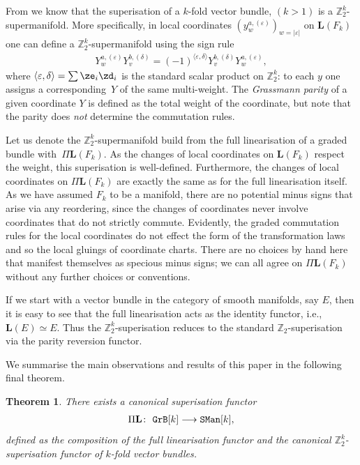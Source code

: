 \documentclass[10pt,a4paper]{amsart}
\newcommand{\ep}{\varepsilon}
\newcommand{\catname}[1]{\textnormal{\texttt{#1}}}
\def\Linr{{\mathbf{L}}} %
\numberwithin{equation}{section}
\newtheorem{Theorem}{Theorem}[section]
\begin{document}
From \cite[Proposition~5.5]{Covolo:2014a} we know that the superisation of a $k$-fold vector bundle, $(k >1)$ is a $ \mathbb{Z}_{2}^k$-supermanifold.
More specif\/ically, in local coordinates $(y^{a, (\ep)}_w)_{w=|\ep|}$ on $\Linr(F_{k})$ one can def\/ine a $\mathbb{Z}_{2}^{k}$-supermanifold using the sign rule
\begin{gather*}
Y^{a, (\ep)}_w Y^{b, (\delta)}_v = (-1)^{\langle \ep , \delta \rangle}Y^{b, (\delta)}_v Y^{a, (\ep)}_w,
\end{gather*}
where $\langle \ep , \delta \rangle=\sum\ze_i\zd_i$ is the standard scalar product on $\mathbb{Z}_{2}^{k}$: to each $y$ one assigns a correspon\-ding~$Y$ of the same multi-weight. The \emph{Grassmann parity} of a given coordinate $Y$ is def\/ined as the total weight of the coordinate, but note that the parity does \emph{not} determine the commutation rules.

Let us denote the $\mathbb{Z}_{2}^{k}$-supermanifold build from the full linearisation of a graded bundle with~$\Pi \Linr(F_{k})$. As the changes of local coordinates on $\Linr(F_{k})$ respect the weight, this superisation is well-def\/ined. Furthermore, the changes of local coordinates on $\Pi \Linr(F_{k})$ are exactly the same as for the full linearisation itself. As we have assumed $F_{k}$ to be a manifold, there are no potential minus signs that arise via any reordering, since the changes of coordinates never involve coordinates that do not strictly commute. Evidently, the graded commutation rules for the local coordinates do not ef\/fect the form of the transformation laws and so the local gluings of coordinate charts. There are no choices by hand here that manifest themselves as specious minus signs; we can all agree on $\Pi \Linr(F_{k})$ without any further choices or conventions.

If we start with a vector bundle in the category of smooth manifolds, say $E$, then it is easy to see that the full linearisation acts as the identity functor, i.e., $\Linr(E) \simeq E$. Thus the $\mathbb{Z}_{2}^{k}$-superisation reduces to the standard $\mathbb{Z}_{2}$-superisation via the parity reversion functor.

We summarise the main observations and results of this paper in the following f\/inal theorem.

\begin{Theorem}\label{thm:superisation}
There exists a canonical superisation functor
\begin{gather*}\Pi \Linr\colon \ \catname{GrB}[k] \longrightarrow \catname{SMan}[k], \end{gather*}
defined as the composition of the full linearisation functor and the canonical $\mathbb{Z}_2^k$-superisation functor of $k$-fold vector bundles.
\end{Theorem}
\end{document}
